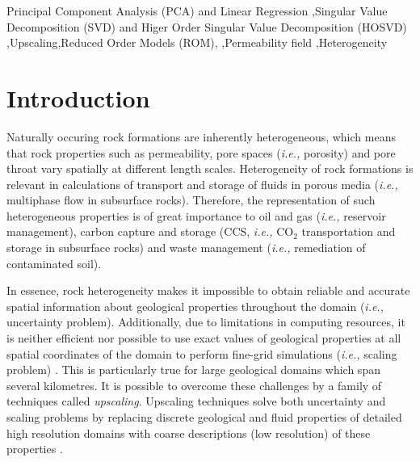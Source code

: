 \documentclass[preprint,12pt]{elsarticle}
\newcommand{\ie}{{\it i.e., }}
\begin{document}
\begin{frontmatter}
\begin{abstract}
It was shown that the new upscaling technique retained the heterogenous nature of the BaseCase (\ie high-resolution configuration). Additionally, the upscaling technique did not require {\it a priori} understanding of similar permeability blocks within the existing domain.

\end{abstract}



\begin{keyword} %
Principal Component Analysis (PCA) and Linear Regression \sep Singular Value Decomposition (SVD) and Higer Order Singular Value Decomposition (HOSVD) \sep Upscaling\sep Reduced Order Models (ROM), \sep Permeability field \sep Heterogeneity
\end{keyword}
 
\end{frontmatter}

\section{Introduction}\label{section:intro}
Naturally occuring rock formations are inherently heterogeneous, which means that rock properties such as permeability, pore spaces (\ie porosity) and pore throat vary spatially at different length scales. Heterogeneity of rock formations is relevant in calculations of transport and storage of fluids in porous media (\ie multiphase flow in subsurface rocks). Therefore, the representation of such heterogeneous properties is of great importance to oil and gas (\ie reservoir management), carbon capture and storage (CCS, \ie CO$_2$ transportation and storage in subsurface rocks) and waste management (\ie remediation of contaminated soil).

In essence, rock heterogeneity makes it impossible to obtain reliable and accurate spatial information about geological properties throughout the domain (\ie uncertainty problem). Additionally, due to limitations in computing resources, it is neither efficient nor possible to use exact values of geological properties at all spatial coordinates of the domain to perform fine-grid simulations (\ie scaling problem) \cite{chen_2006,miller_1998,Renard_1997}. This is particularly true for large geological domains which span several kilometres. It is possible to overcome these challenges by a family of techniques called {\it upscaling}. Upscaling techniques solve both uncertainty and scaling problems by replacing discrete geological and fluid properties of detailed high resolution domains with coarse descriptions (low resolution) of these properties \cite{Vereecken_2007}.
\end{document}

